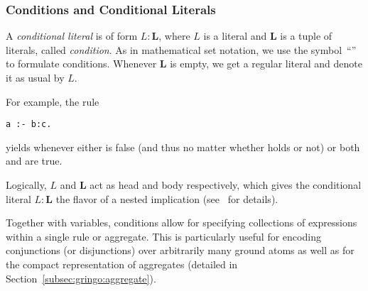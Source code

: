 \subsubsection{Conditions and Conditional Literals}\label{subsec:gringo:condition}
%
%
A \emph{conditional literal} is of form $L:\boldsymbol{L}$,
where $L$ is a literal and $\boldsymbol{L}$ is a tuple of literals, called \textit{condition}.
As in mathematical set notation,
we use the symbol~``\code{:}'' to formulate conditions.
Whenever $\boldsymbol{L}$ is empty, we get a regular literal and denote it as usual by $L$.

For example, the rule
\begin{lstlisting}[numbers=none]
a :- b:c.
\end{lstlisting}
yields  whenever either  is false (and thus no matter whether  holds or not) or both  and  are true.

\begin{note}
Logically, $L$ and $\boldsymbol{L}$ act as head and body respectively,
which gives the conditional literal $L:\boldsymbol{L}$ the flavor of a nested implication
(see~\cite{haliya14a} for details).
\eexample{}
\end{note}

Together with variables,
conditions allow for specifying collections of expressions within a single rule or aggregate.
This is particularly useful for encoding conjunctions (or disjunctions) over
arbitrarily many ground atoms as well as for the compact representation of aggregates
(detailed in Section~\ref{subsec:gringo:aggregate}).

